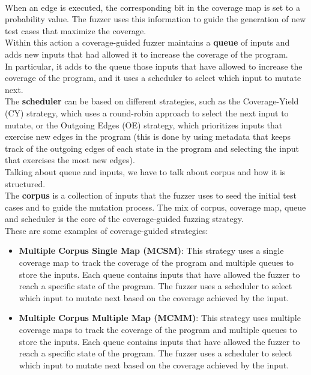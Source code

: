 \phantom{}\\
When an edge is executed, the corresponding bit in the coverage map is set to a probability value. The fuzzer uses this information to guide the generation of new test cases that maximize the coverage.
\\Within this action a coverage-guided fuzzer maintains a \textbf{queue} of inputs and adds new inputs that had allowed it to increase the coverage of the program.
\\In particular, it adds to the queue those inputs that have allowed to increase the coverage of the program, and it uses a scheduler to select which input to mutate next.
\\The \textbf{scheduler} can be based on different strategies, such as the Coverage-Yield (CY) strategy, which uses a round-robin approach to select the next input to mutate, or the Outgoing Edges (OE) strategy, which prioritizes inputs that exercise new edges in the program (this is done by using metadata that keeps track of the outgoing edges of each state in the program and selecting the input that exercises the most new edges).
\\Talking about queue and inputs, we have to talk about corpus and how it is structured.
\\The \textbf{corpus} is a collection of inputs that the fuzzer uses to seed the initial test cases and to guide the mutation process.
The mix of corpus, coverage map, queue and scheduler is the core of the coverage-guided fuzzing strategy.
\\These are some examples of coverage-guided strategies:
\begin{itemize}
    \item \textbf{Multiple Corpus Single Map (MCSM)}: This strategy uses a single coverage map to track the coverage of the program and multiple queues to store the inputs. Each queue contains inputs that have allowed the fuzzer to reach a specific state of the program. The fuzzer uses a scheduler to select which input to mutate next based on the coverage achieved by the input.
    
    \item \textbf{Multiple Corpus Multiple Map (MCMM)}: This strategy uses multiple coverage maps to track the coverage of the program and multiple queues to store the inputs. Each queue contains inputs that have allowed the fuzzer to reach a specific state of the program. The fuzzer uses a scheduler to select which input to mutate next based on the coverage achieved by the input.
\end{itemize}

